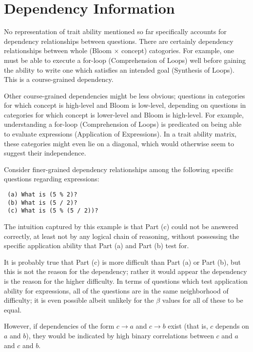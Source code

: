 \section{Dependency Information}

No representation of trait ability mentioned so far specifically accounts for
dependency relationships between questions.  There are certainly dependency
relationships between whole (Bloom $\times$ concept) catogories.  For example,
one must be able to execute a for-loop (Comprehension of Loops) well before
gaining the ability to write one which satisfies an intended goal (Synthesis of
Loops). This is a course-grained dependency.

Other course-grained dependencies might be less obvious; questions in
categories for which concept is high-level and Bloom is low-level, depending on
questions in categories for which concept is lower-level and Bloom is
high-level.  For example, understanding a for-loop (Comprehension of Loops) is
predicated on being able to evaluate expressions (Application of Expressions).
In a trait ability matrix, these categories might even lie on a diagonal, which
would otherwise seem to suggest their independence.

Consider finer-grained dependency relationships among the following specific
questions regarding expressions:

\begin{verbatim}
 (a) What is (5 % 2)?
 (b) What is (5 / 2)?
 (c) What is (5 % (5 / 2))?
\end{verbatim}

The intuition captured by this example is that Part (c) could not be answered
correctly, at least not by any logical chain of reasoning, without possessing
the specific application ability that Part (a) and Part (b) test for.

It is probably true that Part (c) is more difficult than Part (a) or Part (b),
but this is not the reason for the dependency; rather it would appear the
dependency is the reason for the higher difficulty.  In terms of questions
which test application ability for expressions, all of the questions are in the
same neighborhood of difficulty; it is even possible albeit unlikely for the
$\beta$ values for all of these to be equal.  

However, if dependencies of the form $c \rightarrow a$ and $c \rightarrow b$
exist (that is, $c$ depends on $a$ and $b$), they would be indicated by high
binary correlations between $c$ and $a$ and $c$ and $b$.

